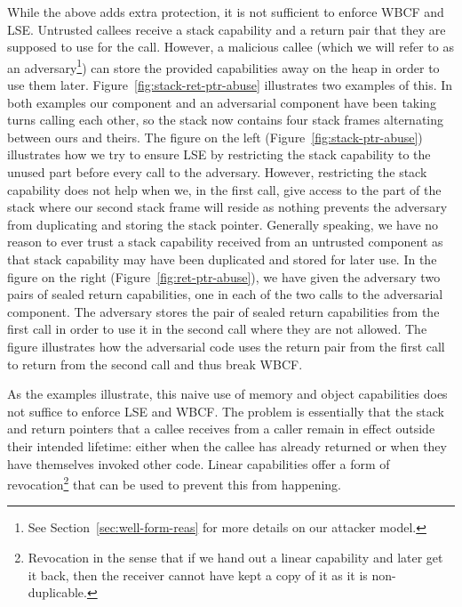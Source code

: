\documentclass{jfp}
\begin{document}
While the above adds extra protection, it is not sufficient to enforce WBCF and LSE.
Untrusted callees receive a stack capability and a return pair that they are supposed to use for the call.
However, a malicious callee (which we will refer to as an adversary\footnote{See Section~\ref{sec:well-form-reas} for more details on our attacker model.}) can store the provided capabilities away on the heap in order to use them later.
Figure~\ref{fig:stack-ret-ptr-abuse} illustrates two examples of this.
In both examples our component and an adversarial component have been taking turns calling each other, so the stack now contains four stack frames alternating between ours and theirs.
The figure on the left (Figure~\ref{fig:stack-ptr-abuse}) illustrates how we try to ensure LSE by restricting the stack capability to the unused part before every call to the adversary.
However, restricting the stack capability does not help when we, in the first call, give access to the part of the stack where our second stack frame will reside as nothing prevents the adversary from duplicating and storing the stack pointer.
Generally speaking, we have no reason to ever trust a stack capability received from an untrusted component as that stack capability may have been duplicated and stored for later use.
In the figure on the right (Figure~\ref{fig:ret-ptr-abuse}), we have given the adversary two pairs of sealed return capabilities, one in each of the two calls to the adversarial component.
The adversary stores the pair of sealed return capabilities from the first call in order to use it in the second call where they are not allowed.
The figure illustrates how the adversarial code uses the return pair from the first call to return from the second call and thus break WBCF.

As the examples illustrate, this naive use of memory and object capabilities does not suffice to enforce LSE and WBCF.
The problem is essentially that the stack and return pointers that a callee receives from a caller remain in effect outside their intended lifetime: either when the callee has already returned or when they have themselves invoked other code. 
Linear capabilities offer a form of revocation\footnote{Revocation in the sense that if we hand out a linear capability and later get it back, then the receiver cannot have kept a copy of it as it is non-duplicable.} that can be used to prevent this from happening.
\end{document}
